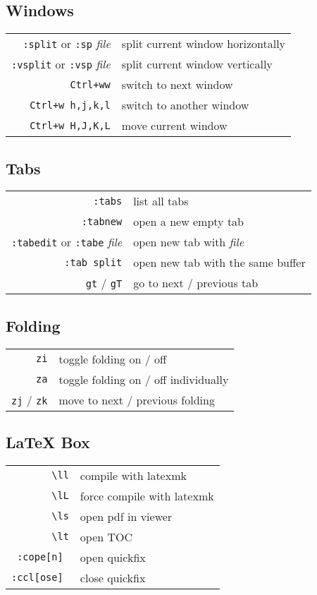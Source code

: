 \begin{multicols*}{3}
\subsection{Windows}
\begin{tabular}{@{}rl@{}}
    \verb|:split| or \verb|:sp| \itshape{file} & split current window horizontally \\
    \verb|:vsplit| or \verb|:vsp| \itshape{file} & split current window vertically \\
    \verb|Ctrl+ww| & switch to next window \\
    \verb|Ctrl+w h,j,k,l| & switch to another window \\
    \verb|Ctrl+w H,J,K,L| & move current window
\end{tabular}

\subsection{Tabs}
\begin{tabular}{@{}rl@{}}
    \verb|:tabs| & list all tabs \\
    \verb|:tabnew| & open a new empty tab \\
    \verb|:tabedit| or \verb|:tabe| \itshape{file} & open new tab with \itshape{file} \\
    \verb|:tab split| & open new tab with the same buffer \\
    \verb|gt| / \verb|gT| & go to next / previous tab
\end{tabular}

\subsection{Folding}
\begin{tabular}{@{}rl@{}}
    \verb|zi| & toggle folding on / off \\
    \verb|za| & toggle folding on / off individually \\
    \verb|zj| / \verb|zk| & move to next / previous folding
\end{tabular}

\subsection{LaTeX Box}
\begin{tabular}{@{}rl@{}}
    \verb|\ll| & compile with latexmk \\
    \verb|\lL| & force compile with latexmk \\
    \verb|\ls| & open pdf in viewer \\
    \verb|\lt| & open TOC \\
    \verb|:cope[n] | & open quickfix \\
    \verb|:ccl[ose] | & close quickfix
\end{tabular}

\end{multicols*}

